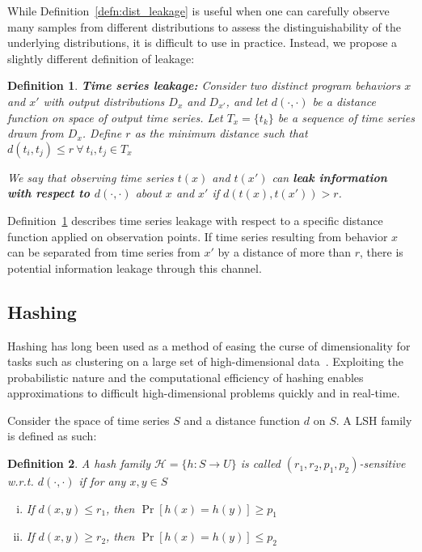 \documentclass[a4paper]{article}
\newtheorem{definition}{Definition}
\begin{document}
While Definition~\ref{defn:dist_leakage} is useful when one can carefully observe many samples from different distributions to assess the distinguishability of the underlying distributions, it is difficult to use in practice.
Instead, we propose a slightly different definition of leakage:

\begin{definition}\label{defn:leakage}
	\textbf{Time series leakage:} Consider two distinct program behaviors $x$ and $x'$ with output distributions $D_x$ and $D_{x'}$, and let $d(\cdot,\cdot)$ be a distance function on space of output time series.
    Let $T_x = \{t_k\}$ be a sequence of time series drawn from $D_x$.
    Define $r$ as the minimum distance such that $d(t_i, t_j) \le r~\forall~t_i,t_j \in T_x$

    We say that observing time series $t(x)$ and $t(x')$ can \textbf{leak information with respect to $d(\cdot,\cdot)$} about $x$ and $x'$ if $d(t(x),t(x')) > r$.
\end{definition}

Definition~\ref{defn:leakage} describes time series leakage with respect to a specific distance function applied on observation points.
If time series resulting from behavior $x$ can be separated from time series from $x'$ by a distance of more than $r$, there is potential information leakage through this channel.

\subsection{Hashing}
\label{subsec:hashing}
Hashing has long been used as a method of easing the curse of dimensionality for tasks such as clustering on a large set of high-dimensional data~\cite{Indyk98-ANN,Gionis99-SSH,Datar04-LSH}.
Exploiting the probabilistic nature and the computational efficiency of hashing enables approximations to difficult high-dimensional problems quickly and in real-time.

Consider the space of time series $S$ and a distance function $d$ on $S$.
A LSH family is defined as such:

\begin{definition}\label{defn:hash_family}
    A hash family $\mathcal{H} = \{ h : S \rightarrow U \}$ is called $(r_1, r_2, p_1, p_2)$-sensitive w.r.t. $d(\cdot,\cdot)$ if for any $x,y \in S$
    \begin{enumerate}[(i)]
        \item\label{itm:hash_def1} If $d(x,y) \le r_1$, then $\Pr[h(x) = h(y)] \ge p_1$
        \item\label{itm:hash_def2} If $d(x,y) \ge r_2$, then $\Pr[h(x) = h(y)] \le p_2$
    \end{enumerate}
\end{definition}
\end{document}
